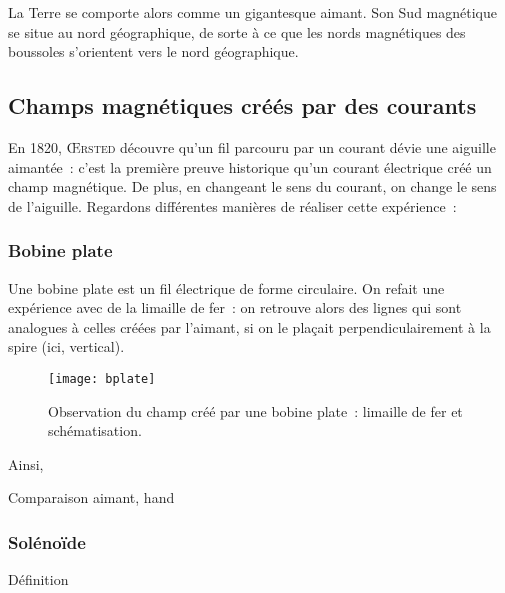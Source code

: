 \documentclass[../main/main.tex]{subfiles}
\begin{document}
La Terre se comporte alors comme un gigantesque aimant. Son Sud magnétique se
situe au nord géographique, de sorte à ce que les nords magnétiques des
boussoles s'orientent vers le nord géographique.

\subsection{Champs magnétiques créés par des courants}
\label{ssec:chpcour}

En 1820, \textsc{Œrsted} découvre qu'un fil parcouru par un courant dévie une
aiguille aimantée~: c'est la première preuve historique qu'un courant électrique
créé un champ magnétique. De plus, en changeant le sens du courant, on change le
sens de l'aiguille. Regardons différentes manières de réaliser cette
expérience~:

\subsubsection{Bobine plate}
\label{sssec:bplate}
Une bobine plate est un fil électrique de forme circulaire. On refait une
expérience avec de la limaille de fer~: on retrouve alors des lignes qui sont
analogues à celles créées par l'aimant, si on le plaçait perpendiculairement à
la spire (ici, vertical).

\begin{figure}[h]
	\centering
	\texttt{[image: bplate]}

	\caption{Observation du champ créé par une bobine plate~: limaille de fer et
		schématisation.}
	\label{fig:bplate}
\end{figure}
Ainsi,
\begin{tprop}{Comparaison aimant, hand}
	\begin{center}
	\end{center}
\end{tprop}

\subsubsection{Solénoïde}
\label{sssec:solen}
\begin{tdefi}{Définition}
	\begin{center}
	\end{center}
\end{tdefi}
\end{document}
